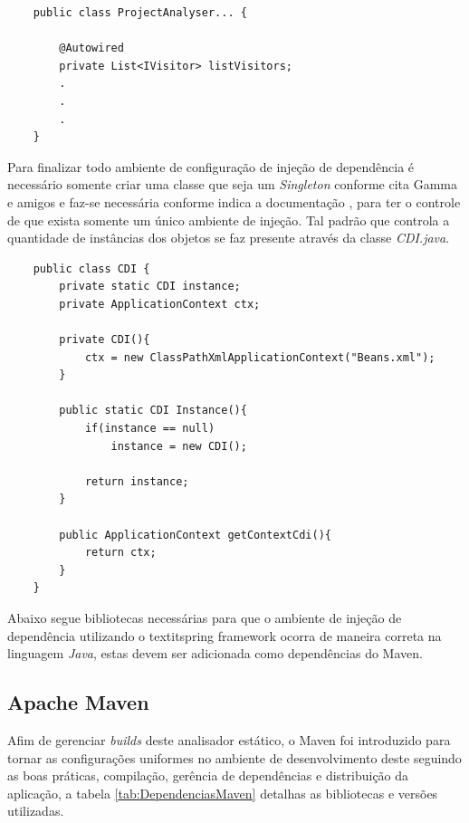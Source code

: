 \begin{lstlisting}
	public class ProjectAnalyser... {

		@Autowired
		private List<IVisitor> listVisitors;
		.
		.
		.
	}
\end{lstlisting}

Para finalizar todo ambiente de configuração de injeção de dependência é necessário somente criar uma classe que seja um {\it Singleton} \cite{Gamma:1995:DPE:186897} conforme cita Gamma e amigos e faz-se necessária conforme indica a documentação \cite{SPRING_REF}, para ter o controle de que exista somente um único ambiente de injeção. Tal padrão que controla a quantidade de instâncias dos objetos se faz presente através da classe \textit{CDI.java}.
\begin{lstlisting}
	public class CDI {
		private static CDI instance;
		private ApplicationContext ctx;
		
		private CDI(){ 
			ctx = new ClassPathXmlApplicationContext("Beans.xml");
		}
		
		public static CDI Instance(){
			if(instance == null)
				instance = new CDI();
		
			return instance;
		}
		
		public ApplicationContext getContextCdi(){
			return ctx;
		}
	}
\end{lstlisting}

Abaixo segue bibliotecas necessárias para que o ambiente de injeção de dependência utilizando o textit{spring framework} \cite{SPRING_REF} ocorra de maneira correta na linguagem \textit{Java}, estas devem ser adicionada como dependências do Maven.


\subsection{Apache Maven}
Afim de gerenciar \textit{builds} deste analisador estático, o Maven foi introduzido para tornar as configurações uniformes no ambiente de desenvolvimento deste seguindo as boas práticas, compilação, gerência de dependências e distribuição da aplicação, a tabela \ref{tab:DependenciasMaven} detalhas as bibliotecas e versões utilizadas.



